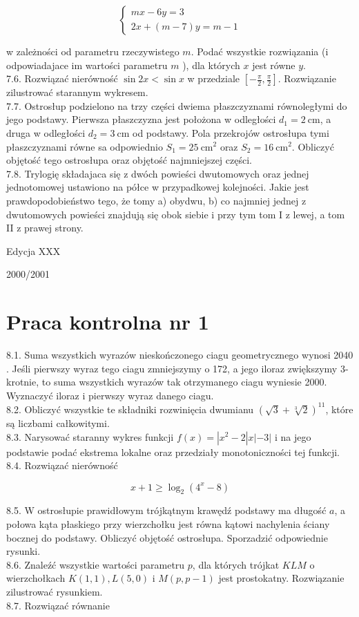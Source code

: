 \documentclass[10pt]{article}
\begin{document}
$$
\left\{\begin{array}{l}
m x-6 y=3 \\
2 x+(m-7) y=m-1
\end{array}\right.
$$

w zależności od parametru rzeczywistego $m$. Podać wszystkie rozwiązania (i odpowiadajace im wartości parametru $m$ ), dla których $x$ jest równe $y$.\\
7.6. Rozwiązać nierówność $\sin 2 x<\sin x$ w przedziale $\left[-\frac{\pi}{2}, \frac{\pi}{2}\right]$. Rozwiązanie zilustrować starannym wykresem.\\
7.7. Ostrosłup podzielono na trzy części dwiema płaszczyznami równoległymi do jego podstawy. Pierwsza płaszczyzna jest położona w odległości $d_{1}=2 \mathrm{~cm}$, a druga w odległości $d_{2}=3 \mathrm{~cm}$ od podstawy. Pola przekrojów ostrosłupa tymi płaszczyznami równe sa odpowiednio $S_{1}=25 \mathrm{~cm}^{2}$ oraz $S_{2}=16 \mathrm{~cm}^{2}$. Obliczyć objętość tego ostrosłupa oraz objętość najmniejszej części.\\
7.8. Trylogię składajaca się z dwóch powieści dwutomowych oraz jednej jednotomowej ustawiono na półce w przypadkowej kolejności. Jakie jest prawdopodobieństwo tego, że tomy a) obydwu, b) co najmniej jednej z dwutomowych powieści znajdują się obok siebie i przy tym tom I z lewej, a tom II z prawej strony.

Edycja XXX

2000/2001

\section*{Praca kontrolna nr 1}
8.1. Suma wszystkich wyrazów nieskończonego ciagu geometrycznego wynosi 2040 . Jeśli pierwszy wyraz tego ciagu zmniejszymy o 172, a jego iloraz zwiększymy 3-krotnie, to suma wszystkich wyrazów tak otrzymanego ciagu wyniesie 2000. Wyznaczyć iloraz i pierwszy wyraz danego ciagu.\\
8.2. Obliczyć wszystkie te składniki rozwinięcia dwumianu $(\sqrt{3}+\sqrt[3]{2})^{11}$, które są liczbami całkowitymi.\\
8.3. Narysować staranny wykres funkcji $f(x)=\left|x^{2}-2\right| x|-3|$ i na jego podstawie podać ekstrema lokalne oraz przedziały monotoniczności tej funkcji.\\
8.4. Rozwiązać nierówność

$$
x+1 \geq \log _{2}\left(4^{x}-8\right)
$$

8.5. W ostrosłupie prawidłowym trójkątnym krawędź podstawy ma długość $a$, a połowa kąta płaskiego przy wierzchołku jest równa kątowi nachylenia ściany bocznej do podstawy. Obliczyć objętość ostrosłupa. Sporzadzić odpowiednie rysunki.\\
8.6. Znaleźć wszystkie wartości parametru $p$, dla których trójkat $K L M$ o wierzchołkach $K(1,1), L(5,0)$ i $M(p, p-1)$ jest prostokatny. Rozwiązanie zilustrować rysunkiem.\\
8.7. Rozwiązać równanie
\end{document}
